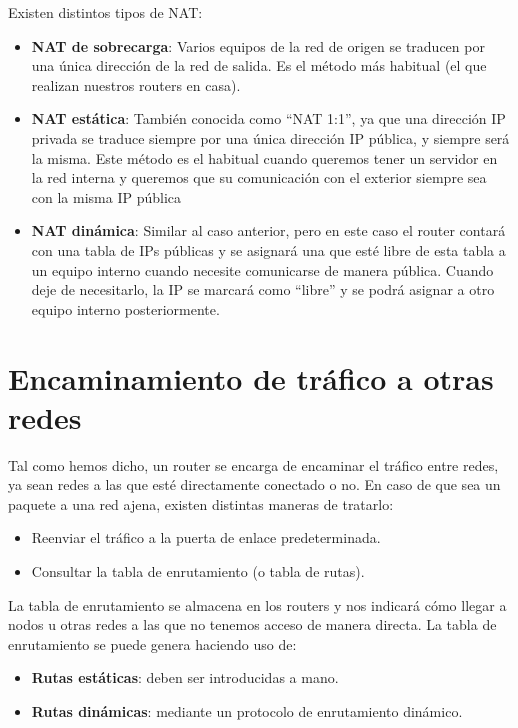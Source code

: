 Existen distintos tipos de NAT:
\begin{itemize}
    \item \textbf{NAT de sobrecarga}: Varios equipos de la red de origen se traducen por una única dirección de la red de salida. Es el método más habitual (el que realizan nuestros routers en casa).

    \item \textbf{NAT estática}: También conocida como “NAT 1:1”, ya que una dirección IP privada se traduce siempre por una única dirección IP pública, y siempre será la misma. Este método es el habitual cuando queremos tener un servidor en la red interna y queremos que su comunicación con el exterior siempre sea con la misma IP pública

    \item \textbf{NAT dinámica}: Similar al caso anterior, pero en este caso el router contará con una tabla de IPs públicas y se asignará una que esté libre de esta tabla a un equipo interno cuando necesite comunicarse de manera pública. Cuando deje de necesitarlo, la IP se marcará como “libre” y se podrá asignar a otro equipo interno posteriormente.
\end{itemize}


\section{Encaminamiento de tráfico a otras redes}

Tal como hemos dicho, un router se encarga de encaminar el tráfico entre redes, ya sean redes a las que esté directamente conectado o no. En caso de que sea un paquete a una red ajena, existen distintas maneras de tratarlo:

\begin{itemize}
    \item Reenviar el tráfico a la puerta de enlace predeterminada.
    \item Consultar la tabla de enrutamiento (o tabla de rutas).
\end{itemize}

La tabla de enrutamiento se almacena en los routers y nos indicará cómo llegar a nodos u otras redes a las que no tenemos acceso de manera directa. La tabla de enrutamiento se puede genera haciendo uso de:

\begin{itemize}
    \item \textbf{Rutas estáticas}: deben ser introducidas a mano.
    \item \textbf{Rutas dinámicas}: mediante un protocolo de enrutamiento dinámico.
\end{itemize}


